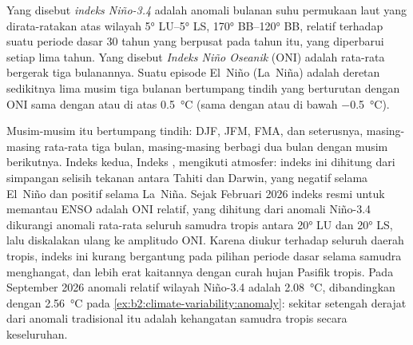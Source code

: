 \begin{definition}\label{def:b2:climate-variability:oni}
Yang disebut \emph{indeks Niño-3.4} adalah anomali bulanan suhu permukaan
laut yang dirata-ratakan atas wilayah \ang{5} LU--\ang{5} LS, \ang{170} BB--\ang{120} BB, relatif terhadap
 suatu periode dasar 30 tahun yang berpusat pada tahun itu, yang diperbarui setiap lima tahun. Yang disebut
\emph{Indeks Niño Oseanik} (ONI) adalah rata-rata bergerak tiga bulanannya. Suatu
episode El~Niño (La~Niña) adalah deretan sedikitnya lima musim tiga bulanan bertumpang tindih yang berturutan
dengan ONI sama dengan atau di atas \qty{+0.5}{\celsius} (sama dengan atau di bawah \qty{-0.5}{\celsius}).
\end{definition}

Musim-musim itu bertumpang tindih: DJF, JFM, FMA, dan seterusnya, masing-masing rata-rata tiga bulan, masing-masing berbagi dua
bulan dengan musim berikutnya. Indeks kedua, Indeks , mengikuti atmosfer: indeks ini
dihitung dari simpangan selisih tekanan antara Tahiti dan Darwin, yang negatif
selama El~Niño dan positif selama La~Niña. Sejak Februari 2026 indeks resmi untuk memantau
ENSO adalah ONI relatif, yang dihitung dari anomali Niño-3.4 dikurangi anomali rata-rata seluruh
samudra tropis antara \ang{20} LU dan \ang{20} LS, lalu diskalakan ulang ke amplitudo ONI. Karena
diukur terhadap seluruh daerah tropis, indeks ini kurang bergantung pada pilihan periode dasar selama samudra
menghangat, dan lebih erat kaitannya dengan curah hujan Pasifik tropis. Pada September 2026
anomali relatif wilayah Niño-3.4 adalah \qty{2.08}{\celsius}, dibandingkan dengan \qty{2.56}{\celsius}
pada \cref{ex:b2:climate-variability:anomaly}: sekitar setengah derajat dari anomali tradisional itu adalah
kehangatan samudra tropis secara keseluruhan.

